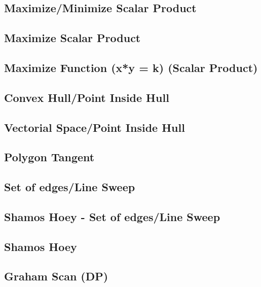 \subsection{Maximize/Minimize Scalar Product}
\raggedbottom
\hrulefill
\subsection{Maximize Scalar Product}
\raggedbottom
\hrulefill
\subsection{Maximize Function (x*y = k) (Scalar Product)}
\raggedbottom
\hrulefill
\subsection{Convex Hull/Point Inside Hull}
\raggedbottom
\hrulefill
\subsection{Vectorial Space/Point Inside Hull}
\raggedbottom
\hrulefill
\subsection{Polygon Tangent}
\raggedbottom
\hrulefill
\subsection{Set of edges/Line Sweep}
\raggedbottom
\hrulefill
\subsection{Shamos Hoey - Set of edges/Line Sweep}
\raggedbottom
\hrulefill
\subsection{Shamos Hoey}
\raggedbottom
\hrulefill
\subsection{Graham Scan (DP)}
\raggedbottom
\hrulefill
